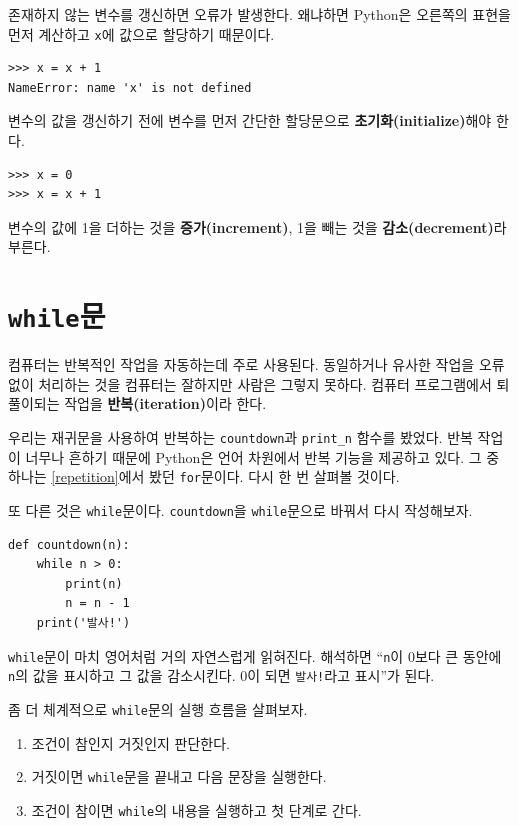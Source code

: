 \documentclass[10pt]{book}
\begin{document}
존재하지 않는 변수를 갱신하면 오류가 발생한다.  왜냐하면 Python은
오른쪽의 표현을 먼저 계산하고 {\tt x}에 값으로 할당하기 때문이다.


\begin{verbatim}
>>> x = x + 1
NameError: name 'x' is not defined
\end{verbatim}
%
변수의 값을 갱신하기 전에 변수를 먼저 간단한 할당문으로 {\bf
  초기화(initialize)}해야 한다.

\begin{verbatim}
>>> x = 0
>>> x = x + 1
\end{verbatim}
%
변수의 값에 1을 더하는 것을 {\bf 증가(increment)}, 1을 빼는 것을 {\bf
  감소(decrement)}라 부른다.




\section{{\tt while}문}

컴퓨터는 반복적인 작업을 자동하는데 주로 사용된다.  동일하거나 유사한
작업을 오류 없이 처리하는 것을 컴퓨터는 잘하지만 사람은 그렇지 못하다.
컴퓨터 프로그램에서 퇴풀이되는 작업을 {\bf 반복(iteration)}이라 한다.

우리는 재귀문을 사용하여 반복하는 {\tt countdown}과 \verb"print_n"
함수를 봤었다.  반복 작업이 너무나 흔하기 때문에 Python은 언어 차원에서
반복 기능을 제공하고 있다.  그 중 하나는 \ref{repetition}에서 봤던
{\tt for}문이다.  다시 한 번 살펴볼 것이다.

또 다른 것은 {\tt while}문이다.  {\tt countdown}을 {\tt while}문으로
바꿔서 다시 작성해보자.


\begin{verbatim}
def countdown(n):
    while n > 0:
        print(n)
        n = n - 1
    print('발사!')
\end{verbatim}
%
{\tt while}문이 마치 영어처럼 거의 자연스럽게 읽혀진다.  해석하면
``{\tt n}이 0보다 큰 동안에 {\tt n}의 값을 표시하고 그 값을
감소시킨다.  0이 되면 {\tt 발사!}라고 표시''가 된다.

좀 더 체계적으로 {\tt while}문의 실행 흐름을 살펴보자. 

\begin{enumerate}

\item 조건이 참인지 거짓인지 판단한다. 

\item 거짓이면 {\tt while}문을 끝내고 다음 문장을 실행한다. 

\item 조건이 참이면 {\tt while}의 내용을 실행하고 첫 단계로 간다. 

\end{enumerate}
\end{document}
